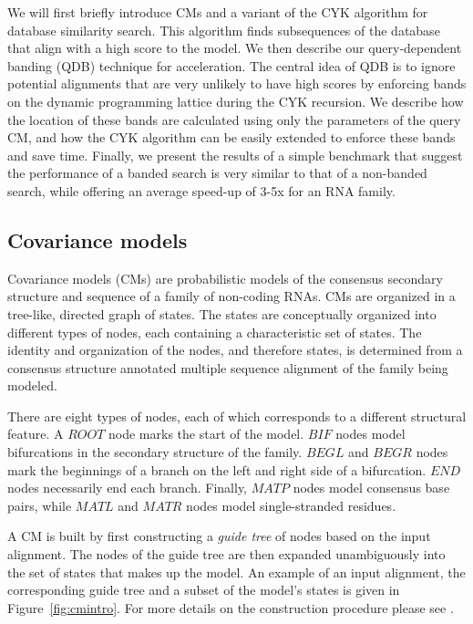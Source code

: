 \documentclass[11pt]{article}
\begin{document}
We will first briefly introduce CMs and a variant of the CYK algorithm for
database similarity search.
This algorithm finds subsequences of the database that align with a
high score to the model.  We then describe our query-dependent banding
(QDB) technique for acceleration. The central idea of QDB is to ignore
potential alignments that are very unlikely to have high scores by
enforcing bands on the dynamic programming lattice during the CYK
recursion. We describe how the location of these bands are calculated
using only the parameters of the query CM, and how the CYK algorithm
can be easily extended to enforce these bands and save time.
Finally, we present the results of a simple benchmark that
suggest the performance of a banded search is very similar
to that of a non-banded search, while offering an average speed-up of
3-5x for an RNA family.

\subsection{Covariance models}

Covariance models (CMs) are probabilistic models of the consensus
secondary structure and sequence of a family of non-coding RNAs. 
CMs are organized in a tree-like, directed graph of states. 
The states are conceptually organized into different types of nodes,
each containing a characteristic set of states.
The identity and organization of the nodes, and therefore states, is
determined from a consensus structure annotated multiple
sequence alignment of the family being modeled. 

There are eight types of nodes, each of which corresponds to a
different structural feature. A $ROOT$ node marks the start of the
model. $BIF$ nodes model bifurcations in the secondary structure of
the family. $BEGL$ and $BEGR$ nodes mark the beginnings of a branch on
the left and right side of a bifurcation. $END$ nodes necessarily end each
branch. Finally, $MATP$ nodes model consensus base pairs, while $MATL$
and $MATR$ nodes model single-stranded residues. 

A CM is built by first constructing a \emph{guide tree} of nodes based
on the input alignment. The nodes of the guide tree are then expanded
unambiguously into the set of states that makes up the model.  An
example of an input alignment, the corresponding guide tree and a
subset of the model's states is given in Figure~\ref{fig:cmintro}. For
more details on the construction procedure please see \cite{Eddy02b, infguide03}.
\end{document}

